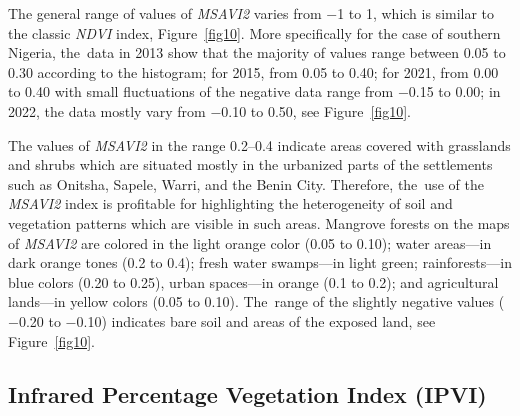 \documentclass[jmse,article,accept,pdftex,moreauthors]{Definitions/mdpi}
\begin{document}
The general range of values of \emph{MSAVI2} varies from $-$1 to 1, which is similar to the classic \emph{NDVI} index, Figure~\ref{fig10}. More specifically for the case of southern Nigeria, the~data in 2013 show that the majority of values range between 0.05 to 0.30 according to the histogram; for 2015, from 0.05 to 0.40; for 2021, from 0.00 to 0.40 with small fluctuations of the negative data range from $-$0.15 to 0.00; in 2022, the data mostly vary from $-$0.10 to 0.50, see Figure~\ref{fig10}. 

The values of \emph{MSAVI2} in the range 0.2--0.4 indicate areas covered with grasslands and shrubs which are situated mostly in the urbanized parts of the settlements such as Onitsha, Sapele, Warri, and the Benin City. Therefore, the~use of the \emph{MSAVI2} index is profitable for highlighting the heterogeneity of soil and vegetation patterns which are visible in such areas. Mangrove forests on the maps of \emph{MSAVI2} are colored in the light orange color (0.05 to 0.10); water areas---in dark orange tones (0.2 to 0.4); fresh water swamps---in light green; rainforests---in blue colors (0.20 to 0.25), urban spaces---in orange (0.1 to 0.2); and agricultural lands---in yellow colors (0.05 to 0.10). The~range of the slightly negative values ($-$0.20 to $-$0.10) indicates bare soil and areas of the exposed land, see Figure~\ref{fig10}.


\subsection{Infrared Percentage Vegetation Index (IPVI)}
\end{document}
